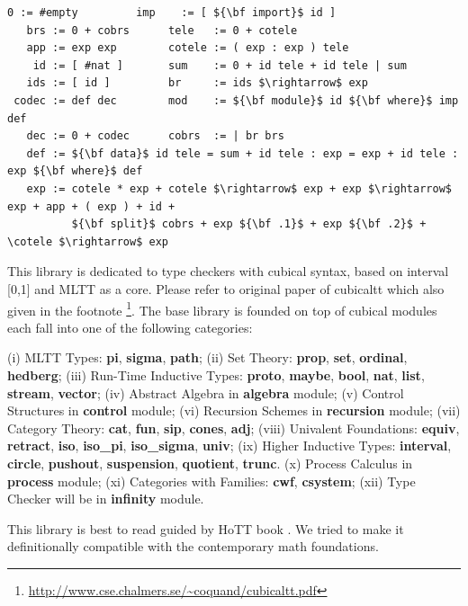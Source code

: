 \documentclass{article}
\begin{document}
\begin{lstlisting}[mathescape=true]
     0 := #empty         imp    := [ ${\bf import}$ id ]
   brs := 0 + cobrs      tele   := 0 + cotele
   app := exp exp        cotele := ( exp : exp ) tele
    id := [ #nat ]       sum    := 0 + id tele + id tele | sum
   ids := [ id ]         br     := ids $\rightarrow$ exp
 codec := def dec        mod    := ${\bf module}$ id ${\bf where}$ imp def
   dec := 0 + codec      cobrs  := | br brs
   def := ${\bf data}$ id tele = sum + id tele : exp = exp + id tele : exp ${\bf where}$ def
   exp := cotele * exp + cotele $\rightarrow$ exp + exp $\rightarrow$ exp + app + ( exp ) + id +
          ${\bf split}$ cobrs + exp ${\bf .1}$ + exp ${\bf .2}$ + \cotele $\rightarrow$ exp

\end{lstlisting}

\newpage

This library is dedicated to type checkers with cubical syntax,
based on interval [0,1] and MLTT as a core.
Please refer to original paper of cubicaltt \cite{Mortberg17}
which also given in the footnote \footnote{\url{http://www.cse.chalmers.se/~coquand/cubicaltt.pdf}}.
The base library is founded on top of cubical modules each
fall into one of the following categories:

(i) MLTT Types: {\bf pi}, {\bf sigma}, {\bf path};
(ii) Set Theory: {\bf prop}, {\bf set}, {\bf ordinal}, {\bf hedberg};
(iii) Run-Time Inductive Types: {\bf proto}, {\bf maybe}, {\bf bool}, {\bf nat}, {\bf list}, {\bf stream}, {\bf vector};
(iv) Abstract Algebra in {\bf algebra} module;
(v) Control Structures in {\bf control} module;
(vi) Recursion Schemes in {\bf recursion} module;
(vii) Category Theory: {\bf cat}, {\bf fun}, {\bf sip}, {\bf cones}, {\bf adj};
(viii) Univalent Foundations: {\bf equiv}, {\bf retract}, {\bf iso}, {\bf iso\_pi}, {\bf iso\_sigma}, {\bf univ};
(ix) Higher Inductive Types: {\bf interval}, {\bf circle}, {\bf pushout}, {\bf suspension}, {\bf quotient}, {\bf trunc}.
(x) Process Calculus in {\bf process} module;
(xi) Categories with Families: {\bf cwf}, {\bf csystem};
(xii) Type Checker will be in {\bf infinity} module.

This library is best to read guided by HoTT book \cite{HoTT}.
We tried to make it definitionally compatible with
the contemporary math foundations.
\end{document}
